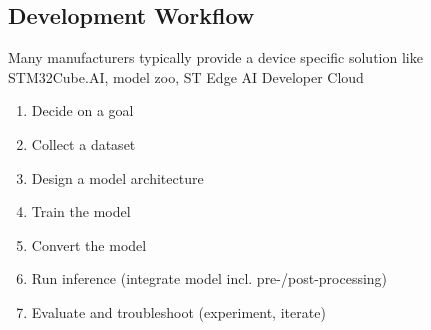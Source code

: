 \subsection{Development Workflow}
Many manufacturers typically provide a device specific solution like STM32Cube.AI, model zoo, ST Edge AI Developer Cloud

\begin{minipage}{0.5\columnwidth}
    \begin{enumerate}
        \item {\color{botbord}Decide on a goal}
        \item {\color{botbord}Collect a dataset}
        \item {\color{botbord}Design a model architecture}
        \item {\color{botbord}Train the model}
        \item {\color{midbord} Convert the model}
        \item {\color{topbord}Run inference (integrate model incl. pre-/post-processing)}
        \item {\color{topbord}Evaluate and troubleshoot (experiment, iterate)}
    \end{enumerate}
\end{minipage}
